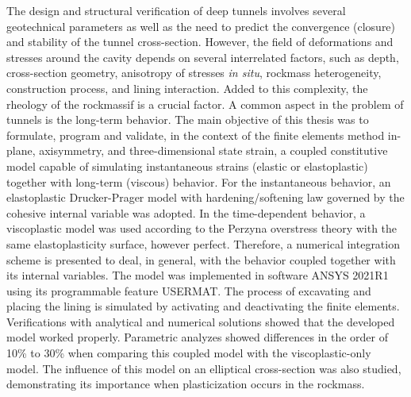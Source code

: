 The design and structural verification of deep tunnels involves several geotechnical parameters as well as the need to predict the convergence (closure) and stability of the tunnel cross-section. However, the field of deformations and stresses around the cavity depends on several interrelated factors, such as depth, cross-section geometry, anisotropy of stresses \textit{in situ}, rockmass heterogeneity, construction process, and lining interaction. Added to this complexity, the rheology of the rockmassif is a crucial factor. A common aspect in the problem of tunnels is the long-term behavior. The main objective of this thesis was to formulate, program and validate, in the context of the finite elements method in-plane, axisymmetry, and three-dimensional state strain, a coupled constitutive model capable of simulating instantaneous strains (elastic or elastoplastic) together with long-term (viscous) behavior. For the instantaneous behavior, an elastoplastic Drucker-Prager model with hardening/softening law governed by the cohesive internal variable was adopted. In the time-dependent behavior, a viscoplastic model was used according to the Perzyna overstress theory with the same elastoplasticity surface, however perfect. Therefore, a numerical integration scheme is presented to deal, in general, with the behavior coupled together with its internal variables. The model was implemented in software ANSYS 2021R1 using its programmable feature USERMAT. The process of excavating and placing the lining is simulated by activating and deactivating the finite elements. Verifications with analytical and numerical solutions showed that the developed model worked properly. Parametric analyzes showed differences in the order of 10\% to 30\% when comparing this coupled model with the viscoplastic-only model. The influence of this model on an elliptical cross-section was also studied, demonstrating its importance when plasticization occurs in the rockmass.